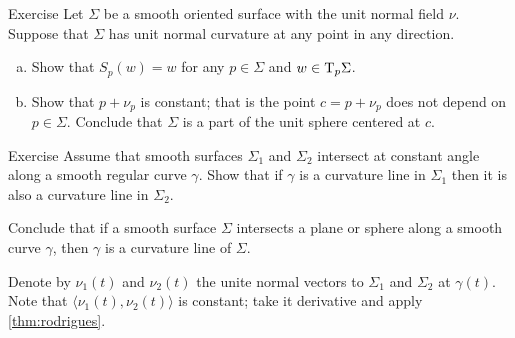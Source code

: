\begin{thm}{Exercise}\label{ex:normal-curvature=const}
Let $\Sigma$ be a smooth oriented surface with the unit normal field $\nu$.
Suppose that $\Sigma$ has unit normal curvature at any point in any direction.
\begin{enumerate}[(a)]
 \item Show that $S_p(w)=w$ for any $p\in\Sigma$ and $w\in \mathrm{T}_p\Sigma$.
 \item Show that $p+\nu_p$ is constant; that is the point $c=p+\nu_p$ does not depend on $p\in\Sigma$.
 Conclude that $\Sigma$ is a part of the unit sphere centered at $c$.
\end{enumerate}

\end{thm}


\begin{thm}{Exercise}\label{ex:shape-curvature-line}
Assume that smooth surfaces $\Sigma_1$ and $\Sigma_2$ intersect at constant angle along a smooth regular curve $\gamma$.
Show that if $\gamma$ is a curvature line in $\Sigma_1$ then it is also a curvature line in $\Sigma_2$.

Conclude that if a smooth surface $\Sigma$ intersects a plane or sphere along a smooth curve $\gamma$,
then $\gamma$ is a curvature line of $\Sigma$.
\end{thm}

  Denote by $\nu_1(t)$ and $\nu_2(t)$ the unite normal vectors to $\Sigma_1$ and $\Sigma_2$ at $\gamma(t)$.
Note that $\langle \nu_1(t),\nu_2(t)\rangle$ is constant; take it derivative and apply \ref{thm:rodrigues}.


